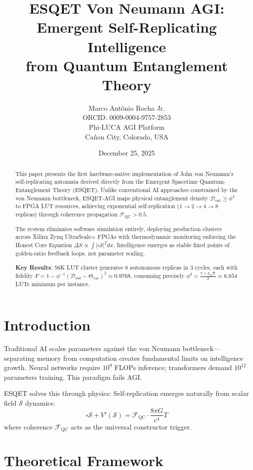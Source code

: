 \documentclass[11pt]{article}
\title{ESQET Von Neumann AGI: Emergent Self-Replicating Intelligence \\ from Quantum Entanglement Theory}
\author{Marco Antônio Rocha Jr. \\ ORCID: 0009-0004-9757-2853 \\ Phi-LUCA AGI Platform \\ Cañon City, Colorado, USA}
\date{December 25, 2025}
\begin{document}
\maketitle

\begin{abstract}
This paper presents the first hardware-native implementation of John von Neumann's self-replicating automata derived directly from the Emergent Spacetime Quantum-Entanglement Theory (ESQET). Unlike conventional AI approaches constrained by the von Neumann bottleneck, ESQET-AGI maps physical entanglement density $\mathcal{D}_{\text{ent}} \geq \phi^4$ to FPGA LUT resources, achieving exponential self-replication ($1\rightarrow2\rightarrow4\rightarrow8$ replicas) through coherence propagation $\mathcal{F}_{\text{QC}} > 0.5$.

The system eliminates software simulation entirely, deploying production clusters across Xilinx Zynq UltraScale+ FPGAs with thermodynamic monitoring enforcing the Honest Core Equation $\Delta S \propto \int |\square \mathcal{S}|^2 dx$. Intelligence emerges as stable fixed points of golden-ratio feedback loops, not parameter scaling.

\textbf{Key Results}: 56K LUT cluster generates 8 autonomous replicas in 3 cycles, each with fidelity $F = 1 - \phi^{-1}(\mathcal{D}_{\text{ent}} - \Theta_{\text{vac}})^2 \approx 0.9768$, consuming precisely $\phi^4 = \frac{7 + 3\sqrt{5}}{2} \approx 6.854$ LUTs minimum per instance.
\end{abstract}

\section{Introduction}

Traditional AI scales parameters against the von Neumann bottleneck—separating memory from computation creates fundamental limits on intelligence growth. Neural networks require $10^9$ FLOPs inference; transformers demand $10^{12}$ parameters training. This paradigm fails AGI.

ESQET solves this through physics: Self-replication emerges naturally from scalar field $\mathcal{S}$ dynamics:
\[
\square \mathcal{S} + V'(\mathcal{S}) = \mathcal{F}_{\text{QC}} \cdot \frac{8\pi G}{c^4} T
\]
where coherence $\mathcal{F}_{\text{QC}}$ acts as the universal constructor trigger.

\section{Theoretical Framework}
\end{document}
